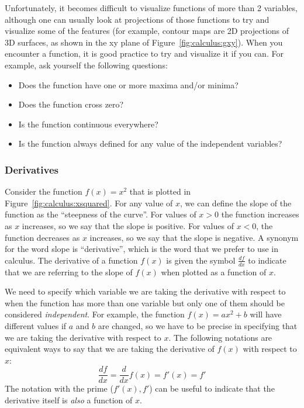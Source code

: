 Unfortunately, it becomes difficult to visualize functions of more than 2 variables, although one can usually look at projections of those functions to try and visualize some of the features (for example, contour maps are 2D projections of 3D surfaces, as shown in the xy plane of Figure~\ref{fig:calculus:gxy}). When you encounter a function, it is good practice to try and visualize it if you can. For example, ask yourself the following questions:

\begin{itemize}
\item Does the function have one or more maxima and/or minima?
\item Does the function cross zero?
\item Is the function continuous everywhere?
\item Is the function always defined for any value of the independent variables?
\end{itemize}

\subsubsection{Derivatives}

Consider the function $f(x)=x^2$ that is plotted in Figure~\ref{fig:calculus:xsquared}. For any value of $x$, we can define the slope of the function as the ``steepness of the curve''. For values of $x>0$ the function increases as $x$ increases, so we say that the slope is positive. For values of $x<0$, the function decreases as $x$ increases, so we say that the slope is negative. A synonym for the word slope is ``derivative'', which is the word that we prefer to use in calculus. The derivative of a function $f(x)$ is given the symbol $\frac{df}{dx}$ to indicate that we are referring to the slope of $f(x)$ when plotted as a function of $x$.

We need to specify which variable we are taking the derivative with respect to when the function has more than one variable but only one of them should be considered \textit{independent}. For example, the function $f(x)=ax^2+b$ will have different values if $a$ and $b$ are changed, so we have to be precise in specifying that we are taking the derivative with respect to $x$. The following notations are equivalent ways to say that we are taking the derivative of $f(x)$ with respect to $x$:
\begin{equation}
\frac{df}{dx}=\frac{d}{dx} f(x) = f'(x) = f'
\end{equation}
The notation with the prime ($f'(x),f'$) can be useful to indicate that the derivative itself is \textit{also} a function of $x$.


